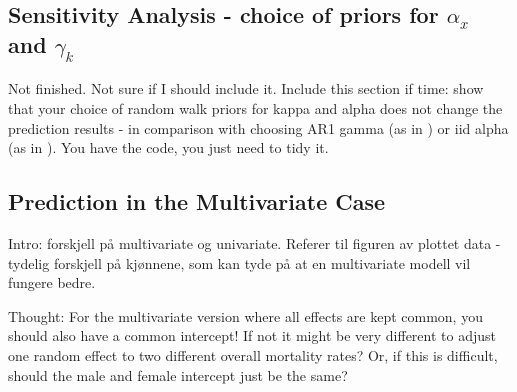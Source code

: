 \subsection{Sensitivity Analysis - choice of priors for $\alpha_x$ and $\gamma_k$}
\textcolor{myDarkBlue}{Not finished. Not sure if I should include it. }
\textcolor{myDarkGreen}{Include this section if time: show that your choice of random walk priors for kappa and alpha does not change the prediction results - in comparison with choosing AR1 gamma (as in \textcite{Wisniowski2015}) or iid alpha (as in \textcite{Wisniowski2015}). 
You have the code, you just need to tidy it. 
}

\newpage
\subsection{Prediction in the Multivariate Case}
\label{sec:pred-mv}

\textcolor{myDarkGreen}{
Intro: forskjell på multivariate og univariate. Referer til figuren av plottet data - tydelig forskjell på kjønnene, som kan tyde på at en multivariate modell vil fungere bedre. 
}

\textcolor{myDarkGreen}{Thought: For the multivariate version where all effects are kept common, you should also have a common intercept! If not it might be very different to adjust one random effect to two different overall mortality rates? Or, if this is difficult, should the male and female intercept just be the same? }

